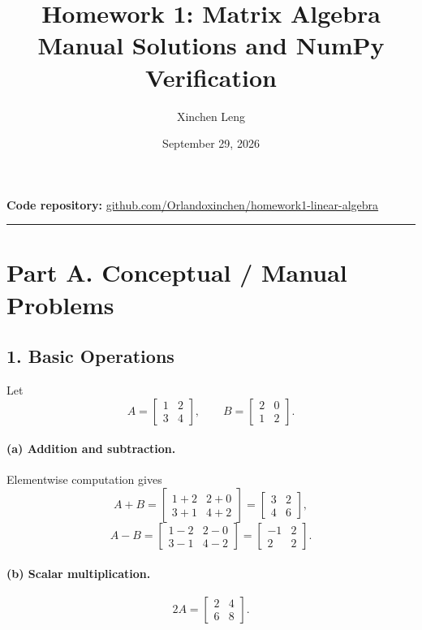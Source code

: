 \documentclass[11pt]{article}
\title{\textbf{Homework 1: Matrix Algebra}\\[4pt]\large Manual Solutions and NumPy Verification}
\author{Xinchen Leng}
\date{September 29, 2026}
\begin{document}
\maketitle

\begin{center}
\small
\textbf{Code repository:}\quad
\href{https://github.com/Orlandoxinchen/homework1-linear-algebra}
{github.com/Orlandoxinchen/homework1-linear-algebra}
\end{center}

\noindent\rule{\textwidth}{0.6pt}

\section*{Part A. Conceptual / Manual Problems}

\subsection*{1. Basic Operations}
Let
\[
A=\begin{bmatrix}1&2\\3&4\end{bmatrix},\qquad
B=\begin{bmatrix}2&0\\1&2\end{bmatrix}.
\]

\paragraph{(a) Addition and subtraction.}
Elementwise computation gives
\[
A+B=\begin{bmatrix}1+2&2+0\\3+1&4+2\end{bmatrix}
=\boxed{\begin{bmatrix}3&2\\4&6\end{bmatrix}},
\]
\[
A-B=\begin{bmatrix}1-2&2-0\\3-1&4-2\end{bmatrix}
=\boxed{\begin{bmatrix}-1&2\\2&2\end{bmatrix}}.
\]

\paragraph{(b) Scalar multiplication.}
\[
2A=\boxed{\begin{bmatrix}2&4\\6&8\end{bmatrix}}.
\]
\end{document}

